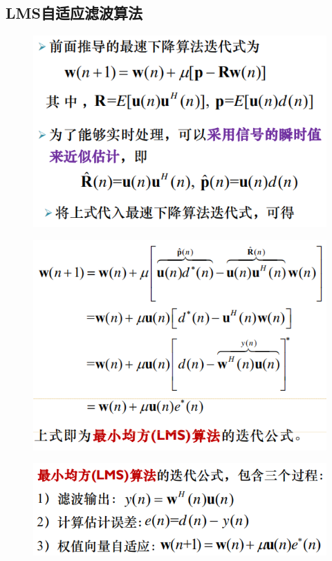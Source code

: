 \documentclass[UTF8]{ctexart} %
\begin{document}
		\subsection{LMS自适应滤波算法}
			\begin{figure}[H]
				\centering\includegraphics[scale=0.5]{21.png}
			\end{figure}
			\begin{figure}[H]
				\centering\includegraphics[scale=0.5]{22.png}
			\end{figure}	
			\begin{figure}[H]
				\centering\includegraphics[scale=0.5]{23.png}
			\end{figure}
	
\end{document}
